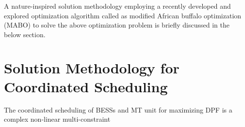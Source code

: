 \documentclass[journal]{IEEEtran}
\begin{document}
 \par A nature-inspired solution methodology employing a recently developed and explored optimization algorithm called as modified African buffalo optimization (MABO) to solve the above optimization problem is briefly discussed in the below section.
%    
%
\section{Solution Methodology for Coordinated Scheduling}\label{section:solution methodology}
The coordinated scheduling of BESSs and MT unit for maximizing DPF is a complex non-linear multi-constraint
\end{document}
